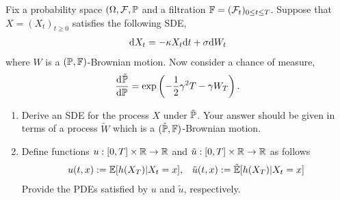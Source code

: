 \begin{problem}
    Fix a probability space \( (\Omega, \mathcal{F}, \mathbb{P}\) and a filtration \( \mathbb{F} = (\mathcal{F}_t )_{0\leq t \leq T} \). Suppose that \( X = (X_t)_{t\geq 0} \) satisfies the following SDE,
    \begin{align*}
        \mathrm{d} X_t = - \kappa X_t\mathrm{d} t + \sigma \mathrm{d} W_t
    \end{align*}
    where \( W \) is a \( (\mathbb{P},\mathbb{F}) \)-Brownian motion. Now consider a chance of measure,
    \begin{align*}
        \frac{\mathrm{d}^{}\tilde{\mathbb{P}}}{\mathrm{d} \mathbb{P}^{}} = \exp \left( -\frac{1}{2}\gamma^2 T - \gamma W_T \right).
    \end{align*}
\begin{enumerate}[nolistsep,label=(\alph*)]
    \item Derive an SDE for the process \( X \) under \( \tilde{\mathbb{P}} \). Your answer should be given in terms of a process \( \tilde{W} \) which is a \( (\tilde{\mathbb{P}},\mathbb{F}) \)-Brownian motion.
    \item Define functions \( u:[0,T]\times \mathbb{R} \to \mathbb{R} \) and \( \tilde{u}:[0,T]\times \mathbb{R} \to \mathbb{R} \) as follows
        \begin{align*}
            u(t,x):= \mathbb{E}[h(X_T) | X_t = x], && \tilde{u}(t,x):= \tilde{\mathbb{E}}[h(X_T) | X_t = x]
        \end{align*}
        Provide the PDEs satisfied by \( u \) and \( \tilde{u} \), respectively.
\end{enumerate}


\end{problem}

